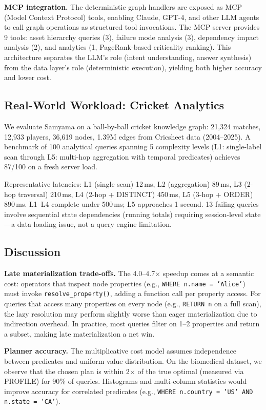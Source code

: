 \documentclass[sigconf, nonacm]{acmart}
\begin{document}
\textbf{MCP integration.}
The deterministic graph handlers are exposed as MCP (Model Context Protocol) tools, enabling Claude, GPT-4, and other LLM agents to call graph operations as structured tool invocations.
The MCP server provides 9 tools: asset hierarchy queries (3), failure mode analysis (3), dependency impact analysis (2), and analytics (1, PageRank-based criticality ranking).
This architecture separates the LLM's role (intent understanding, answer synthesis) from the data layer's role (deterministic execution), yielding both higher accuracy and lower cost.

\subsection{Real-World Workload: Cricket Analytics}
\label{sec:cricket}

We evaluate Samyama on a ball-by-ball cricket knowledge graph: 21,324 matches, 12,933 players, 36,619 nodes, 1.39M edges from Cricsheet data (2004--2025).
A benchmark of 100 analytical queries spanning 5 complexity levels (L1: single-label scan through L5: multi-hop aggregation with temporal predicates) achieves 87/100 on a fresh server load.

Representative latencies: L1 (single scan) 12\,ms, L2 (aggregation) 89\,ms, L3 (2-hop traversal) 210\,ms, L4 (2-hop + DISTINCT) 450\,ms, L5 (3-hop + ORDER) 890\,ms.
L1--L4 complete under 500\,ms; L5 approaches 1 second.
13 failing queries involve sequential state dependencies (running totals) requiring session-level state---a data loading issue, not a query engine limitation.

\subsection{Discussion}
\label{sec:discussion}

\textbf{Late materialization trade-offs.}
The 4.0--4.7$\times$ speedup comes at a semantic cost: operators that inspect node properties (e.g., \texttt{WHERE n.name = 'Alice'}) must invoke \texttt{resolve\_property()}, adding a function call per property access.
For queries that access many properties on every node (e.g., \texttt{RETURN n} on a full scan), the lazy resolution may perform slightly worse than eager materialization due to indirection overhead.
In practice, most queries filter on 1--2 properties and return a subset, making late materialization a net win.

\textbf{Planner accuracy.}
The multiplicative cost model assumes independence between predicates and uniform value distribution.
On the biomedical dataset, we observe that the chosen plan is within 2$\times$ of the true optimal (measured via PROFILE) for 90\% of queries.
Histograms and multi-column statistics would improve accuracy for correlated predicates (e.g., \texttt{WHERE n.country = 'US' AND n.state = 'CA'}).
\end{document}
